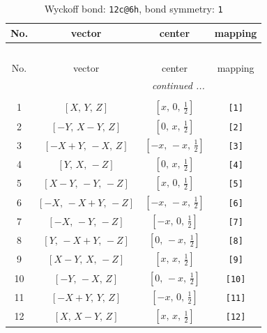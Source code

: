 \documentclass[fleqn,8pt]{jsarticle}
\begin{document}
\begin{longtable}{cccc}
\caption{Wyckoff bond: {\tt 12c@6h}, bond symmetry: {\tt 1}}
 \\
 \hline \hline
No. & vector & center & mapping \\ \hline \endfirsthead

\multicolumn{3}{l}{\tablename\ \thetable{}} \\
 \hline \hline
No. & vector & center & mapping \\ \hline \endhead

 \hline \hline
\multicolumn{3}{r}{\footnotesize\it continued ...} \\ \endfoot

 \hline \hline
\multicolumn{3}{r}{} \\ \endlastfoot

1 & $\left[ X,\, Y,\, Z \right]$ & $\left[ x,\, 0,\, \frac{1}{2} \right]$ & {\tt [1]} \\ \hline
2 & $\left[ - Y,\, X - Y,\, Z \right]$ & $\left[ 0,\, x,\, \frac{1}{2} \right]$ & {\tt [2]} \\ \hline
3 & $\left[ - X + Y,\, - X,\, Z \right]$ & $\left[ - x,\, - x,\, \frac{1}{2} \right]$ & {\tt [3]} \\ \hline
4 & $\left[ Y,\, X,\, - Z \right]$ & $\left[ 0,\, x,\, \frac{1}{2} \right]$ & {\tt [4]} \\ \hline
5 & $\left[ X - Y,\, - Y,\, - Z \right]$ & $\left[ x,\, 0,\, \frac{1}{2} \right]$ & {\tt [5]} \\ \hline
6 & $\left[ - X,\, - X + Y,\, - Z \right]$ & $\left[ - x,\, - x,\, \frac{1}{2} \right]$ & {\tt [6]} \\ \hline
7 & $\left[ - X,\, - Y,\, - Z \right]$ & $\left[ - x,\, 0,\, \frac{1}{2} \right]$ & {\tt [7]} \\ \hline
8 & $\left[ Y,\, - X + Y,\, - Z \right]$ & $\left[ 0,\, - x,\, \frac{1}{2} \right]$ & {\tt [8]} \\ \hline
9 & $\left[ X - Y,\, X,\, - Z \right]$ & $\left[ x,\, x,\, \frac{1}{2} \right]$ & {\tt [9]} \\ \hline
10 & $\left[ - Y,\, - X,\, Z \right]$ & $\left[ 0,\, - x,\, \frac{1}{2} \right]$ & {\tt [10]} \\ \hline
11 & $\left[ - X + Y,\, Y,\, Z \right]$ & $\left[ - x,\, 0,\, \frac{1}{2} \right]$ & {\tt [11]} \\ \hline
12 & $\left[ X,\, X - Y,\, Z \right]$ & $\left[ x,\, x,\, \frac{1}{2} \right]$ & {\tt [12]} \\
\end{longtable}
\end{document}
